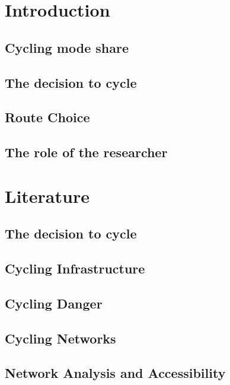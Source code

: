 \documentclass[11pt]{article} %
\begin{document}
\section{Introduction}


\subsection{Cycling mode share}

\subsection{The decision to cycle}

\subsection{Route Choice}

\subsection{The role of the researcher}

\section{Literature}

\subsection{The decision to cycle}

\subsection{Cycling Infrastructure}

\subsection{Cycling Danger}

\subsection{Cycling Networks}

\subsection{Network Analysis and Accessibility}
\end{document}
